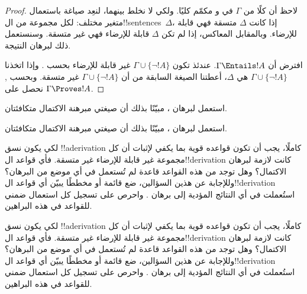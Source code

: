 \documentclass[../../../include/open-logic-section]{subfiles}
\begin{document}
\begin{proof}
لاحظ أن كلًا من $\Gamma$ في  و
 مكمّم كليًا. ولكي لا نخلط بينهما، لنعِد صياغة
 باستعمال متغير مختلف: لكل مجموعة من
ال!!{sentence}s~$\Delta$، إذا كانت $\Delta$ متسقة فهي قابلة للإرضاء.
وبالمقابل المعاكس، إذا لم تكن $\Delta$ قابلة للإرضاء فهي غير متسقة.
وسنستعمل ذلك لبرهان النتيجة.

افترض أن $\Gamma \Entails !A$. عندئذ تكون $\Gamma \cup \{\lnot !A\}$
غير قابلة للإرضاء بحسب . وإذا اتخذنا
$\Gamma \cup \{\lnot !A\}$ هي $\Delta$، أعطتنا الصيغة السابقة من
 أن $\Gamma \cup \{\lnot !A\}$ غير متسقة.
وبحسب
,
نحصل على $\Gamma \Proves !A$.
\end{proof}

\begin{prob}
استعمل  لبرهان
، مبيّنًا بذلك أن صيغتي مبرهنة
الاكتمال متكافئتان.
\end{prob}
\tagendprob

\begin{prob}
استعمل  لبرهان
، مبيّنًا بذلك أن صيغتي مبرهنة
الاكتمال متكافئتان.
\end{prob}
\tagendprob

\begin{prob}
لكي يكون نسق !!a{derivation} كاملًا، يجب أن تكون قواعده قوية بما يكفي
لإثبات أن كل مجموعة غير قابلة للإرضاء غير متسقة. فأي قواعد
ال!!{derivation} كانت لازمة لبرهان الاكتمال؟ وهل توجد من هذه القواعد
قاعدة لم تُستعمل في أي موضع من البرهان؟ وللإجابة عن هذين السؤالين، ضع
قائمة أو مخططًا يبيّن أي قواعد ال!!{derivation} استُعملت في أي النتائج
المؤدية إلى برهان . واحرص على
تسجيل كل استعمال ضمني للقواعد في هذه البراهين.
\end{prob}
\tagendprob

\begin{prob}
لكي يكون نسق !!a{derivation} كاملًا، يجب أن تكون قواعده قوية بما يكفي
لإثبات أن كل مجموعة غير قابلة للإرضاء غير متسقة. فأي قواعد
ال!!{derivation} كانت لازمة لبرهان الاكتمال؟ وهل توجد من هذه القواعد
قاعدة لم تُستعمل في أي موضع من البرهان؟ وللإجابة عن هذين السؤالين، ضع
قائمة أو مخططًا يبيّن أي قواعد ال!!{derivation} استُعملت في أي النتائج
المؤدية إلى برهان . واحرص على
تسجيل كل استعمال ضمني للقواعد في هذه البراهين.
\end{prob}
\tagendprob
\end{document}
